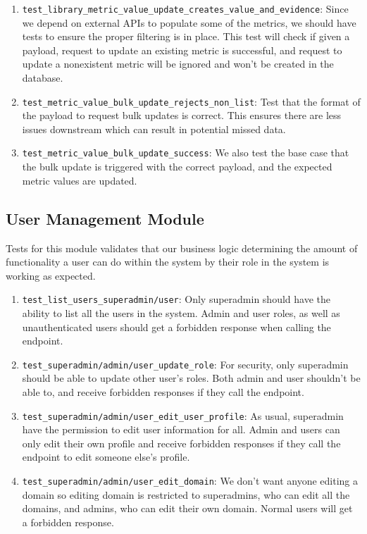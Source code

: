\documentclass[12pt, titlepage]{article}
\begin{document}
\begin{enumerate}
    \item \texttt{test\_library\_metric\_value\_update\_creates\_value\_and\_evidence}: Since we depend on external APIs to populate some of the metrics, we should have tests to ensure the proper filtering is in place. This test will check if given a payload, request to update an existing metric is successful, and request to update a nonexistent metric will be ignored and won't be created in the database.
    \item \texttt{test\_metric\_value\_bulk\_update\_rejects\_non\_list}: Test that the format of the payload to request bulk updates is correct. This ensures there are less issues downstream which can result in potential missed data.
    \item \texttt{test\_metric\_value\_bulk\_update\_success}: We also test the base case that the bulk update is triggered with the correct payload, and the expected metric values are updated.
  \end{enumerate}
\subsection{User Management Module}
  Tests for this module validates that our business logic determining the amount of functionality a user can do within the system by their role in the system is working as expected.
  \begin{enumerate}
    \item \texttt{test\_list\_users\_superadmin/user}: Only superadmin should have the ability to list all the users in the system. Admin and user roles, as well as unauthenticated users should get a forbidden response when calling the endpoint.
    \item \texttt{test\_superadmin/admin/user\_update\_role}: For security, only superadmin should be able to update other user's roles. Both admin and user shouldn't be able to, and receive forbidden responses if they call the endpoint.
    \item \texttt{test\_superadmin/admin/user\_edit\_user\_profile}: As usual, superadmin have the permission to edit user information for all. Admin and users can only edit their own profile and receive forbidden responses if they call the endpoint to edit someone else's profile.
    \item \texttt{test\_superadmin/admin/user\_edit\_domain}: We don't want anyone editing a domain so editing domain is restricted to superadmins, who can edit all the domains, and admins, who can edit their own domain. Normal users will get a forbidden response.
  \end{enumerate}
\end{document}
